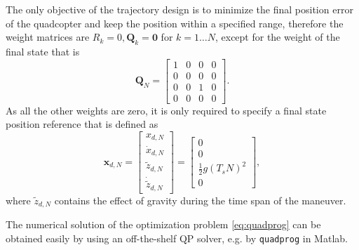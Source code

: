 The only objective of the trajectory design is to minimize the final position error of the quadcopter and keep the position within a specified range, therefore the weight matrices are $R_k = 0, \mathbf Q_k=\boldsymbol 0$ for $k=1\dots N$, except for the weight of the final state that is
\begin{equation}
\mathbf Q_N = \begin{bmatrix} 1 & 0 & 0 & 0 \\ 0 & 0 & 0 & 0 \\ 0 & 0 & 1 & 0 \\ 0 & 0 & 0 & 0 \end{bmatrix}.
\end{equation}
As all the other weights are zero, it is only required to specify a final state position reference that is defined as
\begin{equation}
    \mathbf x_{d,N} = \begin{bmatrix} x_{d,N} \\ \dot{x}_{d,N} \\ {\tilde{z}}_{d,N} \\ \dot{\tilde{z}}_{d,N} \end{bmatrix} = \begin{bmatrix} 0 \\ 0 \\ \frac{1}{2}g(T_s N)^2 \\ 0 \end{bmatrix},
\end{equation}
where ${\tilde{z}}_{d,N}$ contains the effect of gravity during the time span of the maneuver.

The numerical solution of the optimization problem \eqref{eq:quadprog} can be obtained easily by using an off-the-shelf QP solver, e.g. by \verb+quadprog+ in Matlab.  